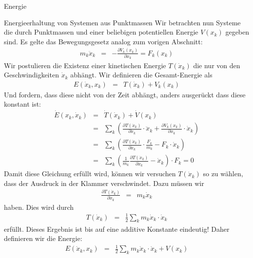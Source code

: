 \begin{chapter}{\titlestr}
\begin{section}{Energie}
\begin{subsection}{Energieerhaltung von Systemen aus Punktmassen}
Wir betrachten nun Systeme die durch Punktmassen und einer beliebigen potentiellen Energie $V(x_k)$ gegeben sind. Es gelte das
Bewegungsgesetz analog zum vorigen Abschnitt:
\begin{eqnarray*}
m_k\ddot{x}_k &=& -\frac{\partial V_k(x_k)}{\partial x_k} = F_k(x_k)
\end{eqnarray*}
Wir postulieren die Existenz einer kinetischen Energie $T(\dot{x}_k)$ die nur von den Geschwindigkeiten $\dot{x}_k$ abhängt.
Wir definieren die Gesamt-Energie als
\begin{eqnarray*}
E(\dot{x}_k, x_k) &=& T(\dot{x}_k)+V_k(x_k)
\end{eqnarray*}
Und fordern, dass diese nicht von der Zeit abhängt, anders ausgerückt dass diese konstant ist:
\begin{eqnarray*}
\dot{E}(x_k,\dot{x}_k) &=& \dot{T}(\dot{x}_k)+\dot{V}(x_k)\\
&=& \sum_k\left(\frac{\partial T(\dot{x}_k)}{\partial \dot{x}_k}\cdot \ddot{x}_k+\frac{\partial V_k(x_k)}{\partial x_k}\cdot \dot{x}_k\right)\\
&=& \sum_k\left(\frac{\partial T(\dot{x}_k)}{\partial \dot{x}_k}\cdot \frac{F_k}{m_k}-F_k\cdot \dot{x}_k\right)\\
&=& \sum_k\left(\frac{1}{m_k}\frac{\partial T(\dot{x}_k)}{\partial \dot{x}_k}-\dot{x}_k\right)\cdot F_k=0
\end{eqnarray*}
Damit diese Gleichung erfüllt wird, können wir versuchen $T(\dot{x}_k)$ so zu wählen, dass der Ausdruck in der Klammer verschwindet.
Dazu müssen wir
\begin{eqnarray*}
\frac{\partial T(\dot{x}_k)}{\partial \dot{x}_k} &=& m_k\dot{x}_k
\end{eqnarray*}
haben. Dies wird durch
\begin{eqnarray*}
T(\dot{x}_k) &=& \frac{1}{2}\sum_km_k\dot{x}_k\cdot \dot{x}_k
\end{eqnarray*}
erfüllt. Dieses Ergebnis ist bis auf eine additive Konstante eindeutig!
Daher definieren wir die Energie:
\begin{eqnarray}
\label{point_mass_energy}
E(\dot{x}_k,x_k) &=& \frac{1}{2}\sum_km_k\dot{x}_k\cdot \dot{x}_k+V(x_k)
\end{eqnarray}

\end{subsection}
\end{section}



\end{chapter}
